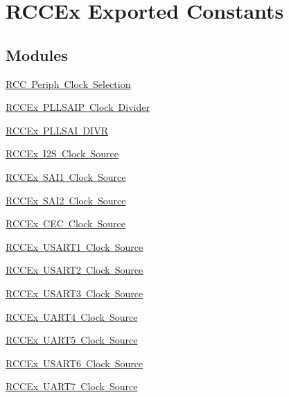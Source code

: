 \hypertarget{group___r_c_c_ex___exported___constants}{}\section{R\+C\+C\+Ex Exported Constants}
\label{group___r_c_c_ex___exported___constants}
\subsection*{Modules}
\begin{DoxyCompactItemize}
\item 
\mbox{\hyperlink{group___r_c_c_ex___periph___clock___selection}{R\+C\+C Periph Clock Selection}}
\item 
\mbox{\hyperlink{group___r_c_c_ex___p_l_l_s_a_i_p___clock___divider}{R\+C\+C\+Ex P\+L\+L\+S\+A\+I\+P Clock Divider}}
\item 
\mbox{\hyperlink{group___r_c_c_ex___p_l_l_s_a_i___d_i_v_r}{R\+C\+C\+Ex P\+L\+L\+S\+A\+I D\+I\+VR}}
\item 
\mbox{\hyperlink{group___r_c_c_ex___i2_s___clock___source}{R\+C\+C\+Ex I2\+S Clock Source}}
\item 
\mbox{\hyperlink{group___r_c_c_ex___s_a_i1___clock___source}{R\+C\+C\+Ex S\+A\+I1 Clock Source}}
\item 
\mbox{\hyperlink{group___r_c_c_ex___s_a_i2___clock___source}{R\+C\+C\+Ex S\+A\+I2 Clock Source}}
\item 
\mbox{\hyperlink{group___r_c_c_ex___c_e_c___clock___source}{R\+C\+C\+Ex C\+E\+C Clock Source}}
\item 
\mbox{\hyperlink{group___r_c_c_ex___u_s_a_r_t1___clock___source}{R\+C\+C\+Ex U\+S\+A\+R\+T1 Clock Source}}
\item 
\mbox{\hyperlink{group___r_c_c_ex___u_s_a_r_t2___clock___source}{R\+C\+C\+Ex U\+S\+A\+R\+T2 Clock Source}}
\item 
\mbox{\hyperlink{group___r_c_c_ex___u_s_a_r_t3___clock___source}{R\+C\+C\+Ex U\+S\+A\+R\+T3 Clock Source}}
\item 
\mbox{\hyperlink{group___r_c_c_ex___u_a_r_t4___clock___source}{R\+C\+C\+Ex U\+A\+R\+T4 Clock Source}}
\item 
\mbox{\hyperlink{group___r_c_c_ex___u_a_r_t5___clock___source}{R\+C\+C\+Ex U\+A\+R\+T5 Clock Source}}
\item 
\mbox{\hyperlink{group___r_c_c_ex___u_s_a_r_t6___clock___source}{R\+C\+C\+Ex U\+S\+A\+R\+T6 Clock Source}}
\item 
\mbox{\hyperlink{group___r_c_c_ex___u_a_r_t7___clock___source}{R\+C\+C\+Ex U\+A\+R\+T7 Clock Source}}

\end{DoxyCompactItemize}
